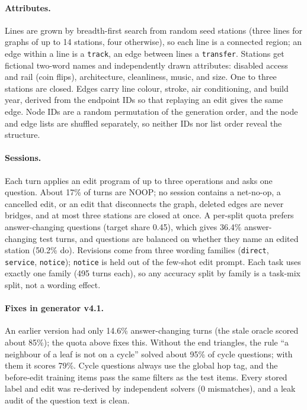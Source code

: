 \documentclass[11pt]{article}
\begin{document}
\paragraph{Attributes.}
Lines are grown by breadth-first search from random seed stations (three lines for graphs of up to 14 stations, four otherwise), so each line is a connected region; an edge within a line is a \texttt{track}, an edge between lines a \texttt{transfer}.
Stations get fictional two-word names and independently drawn attributes: disabled access and rail (coin flips), architecture, cleanliness, music, and size.
One to three stations are closed.
Edges carry line colour, stroke, air conditioning, and build year, derived from the endpoint IDs so that replaying an edit gives the same edge.
Node IDs are a random permutation of the generation order, and the node and edge lists are shuffled separately, so neither IDs nor list order reveal the structure.

\paragraph{Sessions.}
Each turn applies an edit program of up to three operations and asks one question.
About 17\% of turns are NOOP; no session contains a net-no-op, a cancelled edit, or an edit that disconnects the graph, deleted edges are never bridges, and at most three stations are closed at once.
A per-split quota prefers answer-changing questions (target share 0.45), which gives 36.4\% answer-changing test turns, and questions are balanced on whether they name an edited station (50.2\% do).
Revisions come from three wording families (\texttt{direct}, \texttt{service}, \texttt{notice}); \texttt{notice} is held out of the few-shot edit prompt.
Each task uses exactly one family (495 turns each), so any accuracy split by family is a task-mix split, not a wording effect.

\paragraph{Fixes in generator v4.1.}
An earlier version had only 14.6\% answer-changing turns (the stale oracle scored about 85\%); the quota above fixes this.
Without the end triangles, the rule ``a neighbour of a leaf is not on a cycle'' solved about 95\% of cycle questions; with them it scores 79\%.
Cycle questions always use the global hop tag, and the before-edit training items pass the same filters as the test items.
Every stored label and edit was re-derived by independent solvers (0 mismatches), and a leak audit of the question text is clean.
\end{document}
